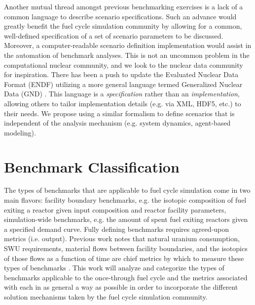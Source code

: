 \documentclass{anstrans}
\begin{document}
Another mutual thread amongst previous benchmarking exercises is a
lack of a common language to describe scenario specifications. Such an
advance would greatly benefit the fuel cycle simulation community by
allowing for a common, well-defined specification of a set of scenario
parameters to be discussed. Moreover, a computer-readable scenario
definition implementation would assist in the automation of benchmark
analyses. This is not an uncommon problem in the computational nuclear
community, and we look to the nuclear data community for
inspiration. There has been a push to update the Evaluated Nuclear
Data Format (ENDF) utilizing a more general language termed
Generalized Nuclear Data (GND) \cite{mattoon_generalized_2012}. This
language is a \emph{specification} rather than an
\emph{implementation}, allowing others to tailor implementation
details (e.g. via XML, HDF5, etc.) to their needs. We propose using a
similar formalism to define scenarios that is independent of the
analysis mechanism (e.g. system dynamics, agent-based modeling).

\section{Benchmark Classification}
The types of benchmarks that are applicable to fuel cycle simulation
come in two main flavors: facility boundary benchmarks, e.g. the
isotopic composition of fuel exiting a reactor given input composition
and reactor facility parameters, simulation-wide benchmarks, e.g. the
amount of spent fuel exiting reactors given a specified demand curve.
Fully defining benchmarks requires agreed-upon metrics (i.e. output).
Previous work notes that natural uranium consumption, SWU 
requirements, material flows between facility boundaries, and the 
isotopics of those flows as a function of time are chief metrics by
which to measure these types of benchmarks 
\cite{boucher_specification_2008}. This work will analyze and 
categorize the types of benchmarks applicable to the once-through 
fuel cycle and the metrics associated with each in as general a way
as possible in order to incorporate the different solution mechanisms
taken by the fuel cycle simulation community.

\end{document}

